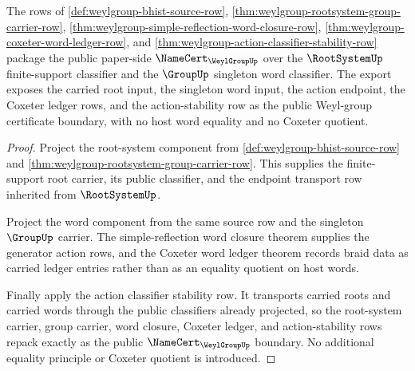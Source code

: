 \begin{theorem}
\label{thm:weylgroup-public-namecert-export}
The rows of \autoref{def:weylgroup-bhist-source-row},
\autoref{thm:weylgroup-rootsystem-group-carrier-row},
\autoref{thm:weylgroup-simple-reflection-word-closure-row},
\autoref{thm:weylgroup-coxeter-word-ledger-row}, and
\autoref{thm:weylgroup-action-classifier-stability-row} package the public
paper-side $\NameCert_{\WeylGroupUp}$ over the $\RootSystemUp$
finite-support classifier and the $\GroupUp$ singleton word classifier. The
export exposes the carried root input, the singleton word input, the action
endpoint, the Coxeter ledger rows, and the action-stability row as the public
Weyl-group certificate boundary, with no host word equality and no Coxeter
quotient.
\end{theorem}
\begin{proof}
Project the root-system component from
\autoref{def:weylgroup-bhist-source-row} and
\autoref{thm:weylgroup-rootsystem-group-carrier-row}. This supplies the
finite-support root carrier, its public classifier, and the endpoint
transport row inherited from $\RootSystemUp$.

Project the word component from the same source row and the singleton
$\GroupUp$ carrier. The simple-reflection word closure theorem supplies the
generator action rows, and the Coxeter word ledger theorem records braid data
as carried ledger entries rather than as an equality quotient on host words.

Finally apply the action classifier stability row. It transports carried
roots and carried words through the public classifiers already projected, so
the root-system carrier, group carrier, word closure, Coxeter ledger, and
action-stability rows repack exactly as the public
$\NameCert_{\WeylGroupUp}$ boundary. No additional equality principle or
Coxeter quotient is introduced.
\end{proof}

